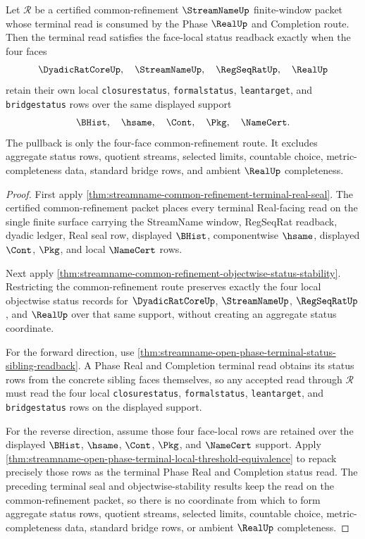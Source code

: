 \begin{theorem}
\label{thm:streamname-common-refinement-terminal-status-pullback}
Let $\mathcal R$ be a certified common-refinement $\StreamNameUp$ finite-window packet whose terminal read is consumed by the Phase $\RealUp$ and Completion route. Then the terminal read satisfies the face-local status readback exactly when the four faces
$$
\DyadicRatCoreUp,\quad \StreamNameUp,\quad \RegSeqRatUp,\quad \RealUp
$$
retain their own local \texttt{closurestatus}, \texttt{formalstatus}, \texttt{leantarget}, and \texttt{bridgestatus} rows over the same displayed support
$$
\BHist,\quad \hsame,\quad \Cont,\quad \Pkg,\quad \NameCert.
$$
The pullback is only the four-face common-refinement route. It excludes aggregate status rows, quotient streams, selected limits, countable choice, metric-completeness data, standard bridge rows, and ambient $\RealUp$ completeness.
\end{theorem}
\begin{proof}
First apply \autoref{thm:streamname-common-refinement-terminal-real-seal}. The certified common-refinement packet places every terminal Real-facing read on the single finite surface carrying the StreamName window, RegSeqRat readback, dyadic ledger, Real seal row, displayed $\BHist$, componentwise $\hsame$, displayed $\Cont$, $\Pkg$, and local $\NameCert$ rows.

Next apply \autoref{thm:streamname-common-refinement-objectwise-status-stability}. Restricting the common-refinement route preserves exactly the four local objectwise status records for $\DyadicRatCoreUp$, $\StreamNameUp$, $\RegSeqRatUp$, and $\RealUp$ over that same support, without creating an aggregate status coordinate.

For the forward direction, use \autoref{thm:streamname-open-phase-terminal-status-sibling-readback}. A Phase Real and Completion terminal read obtains its status rows from the concrete sibling faces themselves, so any accepted read through $\mathcal R$ must read the four local \texttt{closurestatus}, \texttt{formalstatus}, \texttt{leantarget}, and \texttt{bridgestatus} rows on the displayed support.

For the reverse direction, assume those four face-local rows are retained over the displayed $\BHist$, $\hsame$, $\Cont$, $\Pkg$, and $\NameCert$ support. Apply \autoref{thm:streamname-open-phase-terminal-local-threshold-equivalence} to repack precisely those rows as the terminal Phase Real and Completion status read. The preceding terminal seal and objectwise-stability results keep the read on the common-refinement packet, so there is no coordinate from which to form aggregate status rows, quotient streams, selected limits, countable choice, metric-completeness data, standard bridge rows, or ambient $\RealUp$ completeness.
\end{proof}
